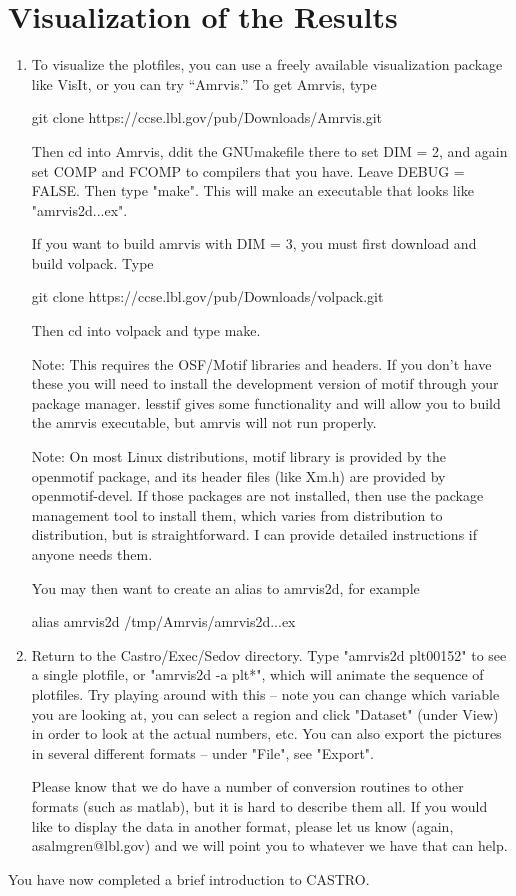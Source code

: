 \section{Visualization of the Results}

\begin{enumerate}

\item To visualize the plotfiles, you can use a freely available visualization package
like VisIt, or you can try ``Amrvis.'' To get Amrvis, type

\noindent git clone https://ccse.lbl.gov/pub/Downloads/Amrvis.git 

\noindent Then cd into Amrvis, ddit the GNUmakefile there to set DIM = 2, and again set COMP and FCOMP to 
compilers that you have. Leave DEBUG = FALSE. Then type "make".  This will make an 
executable that looks like "amrvis2d...ex".

If you want to build amrvis with DIM = 3, you must first download and build volpack.  Type

\noindent git clone https://ccse.lbl.gov/pub/Downloads/volpack.git 

\noindent Then cd into volpack and type make.

\noindent Note: This requires the OSF/Motif libraries and headers. If you don't have these 
you will need to install the development version of motif through your package manager. 
lesstif gives some functionality and will allow you to build the amrvis executable, 
but amrvis will not run properly.

\noindent Note: On most Linux distributions, motif library is provided by the openmotif package, 
and its header files (like Xm.h) are provided by openmotif-devel. If those packages are not 
installed, then use the package management tool to install them, which varies from distribution 
to distribution, but is straightforward. I can provide detailed instructions if anyone needs them.

You may then want to create an alias to amrvis2d, for example

alias amrvis2d /tmp/Amrvis/amrvis2d...ex

\item Return to the Castro/Exec/Sedov directory. 
Type "amrvis2d plt00152" to see a single plotfile, or "amrvis2d -a plt*", 
which will animate the sequence of plotfiles. Try playing around with this -- note you can change which 
variable you are looking at, you can select a region and click "Dataset" (under View) in order to look at 
the actual numbers, etc. You can also export the pictures in several different formats -- under "File", see "Export".

Please know that we do have a number of conversion routines to other formats (such as matlab), 
but it is hard to describe them all. If you would like to display the data in another format, 
please let us know (again, asalmgren@lbl.gov) and we will point you to whatever we have that can help.

\end{enumerate}

You have now completed a brief introduction to CASTRO. 
